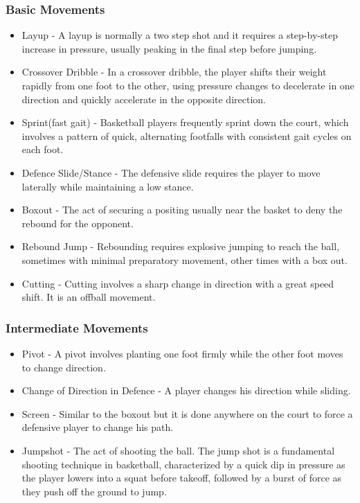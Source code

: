 \subsubsection{Basic Movements}
\label{sssec:basic_movements}

\begin{itemize}
  \item Layup - A layup is normally a two step shot and it requires a step-by-step increase in pressure, usually peaking in the final step before jumping.
  \item Crossover Dribble - In a crossover dribble, the player shifts their weight rapidly from one foot to the other, using pressure changes to decelerate in one direction and quickly accelerate in the opposite direction.
  \item Sprint(fast gait) - Basketball players frequently sprint down the court, which involves a pattern of quick, alternating footfalls with consistent gait cycles on each foot.
  \item Defence Slide/Stance - The defensive slide requires the player to move laterally while maintaining a low stance.
  \item Boxout - The act of securing a positing usually near the basket to deny the rebound for the opponent.
  \item Rebound Jump - Rebounding requires explosive jumping to reach the ball, sometimes with minimal preparatory movement, other times with a box out.
  \item Cutting - Cutting involves a sharp change in direction with a great speed shift. It is an offball movement.
  
\end{itemize}

\subsubsection{Intermediate Movements}
\label{sssec:intermediate_movements}

\begin{itemize}
  \item Pivot - A pivot involves planting one foot firmly while the other foot moves to change direction.
  \item Change of Direction in Defence - A player changes his direction while sliding.
  \item Screen - Similar to the boxout but it is done anywhere on the court to force a defensive player to change his path.
  \item Jumpshot - The act of shooting the ball. The jump shot is a fundamental shooting technique in basketball, characterized by a quick dip in pressure as the player lowers into a squat before takeoff, followed by a burst of force as they push off the ground to jump.
\end{itemize}

